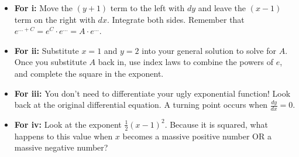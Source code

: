\begin{hint}
\begin{itemize}
    \item \textbf{For i:} Move the $(y+1)$ term to the left with $dy$ and leave the $(x-1)$ term on the right with $dx$. Integrate both sides. Remember that $e^{\dots + C} = e^C \cdot e^{\dots} = A \cdot e^{\dots}$.
    \item \textbf{For ii:} Substitute $x=1$ and $y=2$ into your general solution to solve for $A$. Once you substitute $A$ back in, use index laws to combine the powers of $e$, and complete the square in the exponent.
    \item \textbf{For iii:} You don't need to differentiate your ugly exponential function! Look back at the original differential equation. A turning point occurs when $\frac{dy}{dx} = 0$.
    \item \textbf{For iv:} Look at the exponent $\frac{1}{2}(x-1)^2$. Because it is squared, what happens to this value when $x$ becomes a massive positive number OR a massive negative number? 
\end{itemize}
\end{hint}

